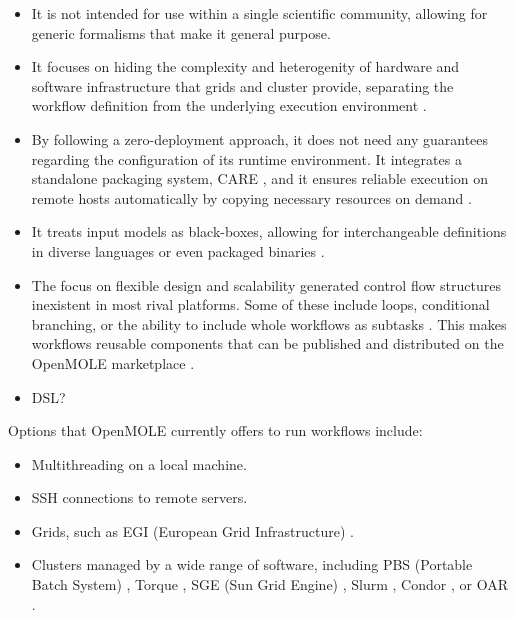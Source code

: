 \documentclass[11pt,a4paper]{report}
\begin{document}
\begin{itemize}
	\item It is not intended for use within a single scientific community, allowing for generic formalisms that make it general purpose.
	\item It focuses on hiding the complexity and heterogenity of hardware and software infrastructure that grids and cluster provide, separating the workflow definition from the underlying execution environment \cite{Reuillon2010}.
	\item By following a zero-deployment approach, it does not need any guarantees regarding the configuration of its runtime environment. It integrates a standalone packaging system, CARE \cite{Janin.etal.2014}, and it ensures reliable execution on remote hosts automatically by copying necessary resources on demand \cite{Reuillon2015}.
	\item It treats input models as black-boxes, allowing for interchangeable definitions in diverse languages or even packaged binaries \cite{Reuillon2013}.
	\item The focus on flexible design and scalability generated control flow structures inexistent in most rival platforms. Some of these include loops, conditional branching, or the ability to include whole workflows as subtasks \cite{Reuillon2013}. This makes workflows reusable components that can be published and distributed on the OpenMOLE marketplace \cite{OpenMOLEMarketplace}.
	\item DSL? 
\end{itemize}


Options that OpenMOLE currently offers to run workflows include:

\begin{itemize}
	\item Multithreading on a local machine.
	\item SSH connections to remote servers.
	\item Grids, such as EGI (European Grid Infrastructure) \cite{EGI}.
	\item Clusters managed by a wide range of software, including PBS (Portable Batch System) \cite{PBS}, Torque \cite{Torque}, SGE (Sun Grid Engine) \cite{SGE}, Slurm \cite{SLURM}, Condor \cite{HTCondor}, or OAR \cite{OAR}.
\end{itemize}
\end{document}
